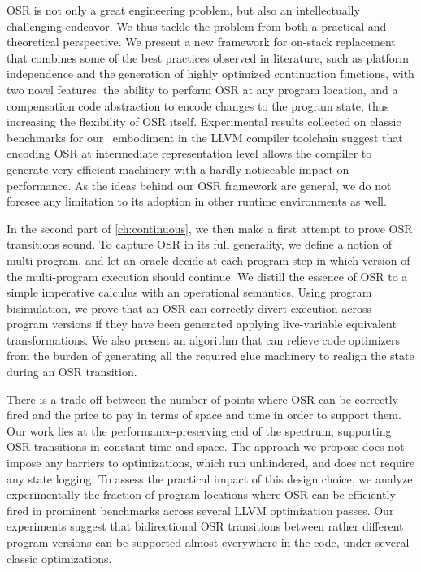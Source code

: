 OSR is not only a great engineering problem, but also an intellectually challenging endeavor. We thus tackle the problem from both a practical and theoretical perspective. We present a new framework for on-stack replacement that combines some of the best practices observed in literature, such as platform independence and the generation of highly optimized continuation functions, with two novel features: the ability to perform OSR at any program location, and a compensation code abstraction to encode changes to the program state, thus increasing the flexibility of OSR itself. Experimental results collected on classic benchmarks for our \osrkit\ embodiment in the LLVM compiler toolchain suggest that encoding OSR at intermediate representation level allows the compiler to generate very efficient machinery with a hardly noticeable impact on performance. As the ideas behind our OSR framework are general, we do not foresee any limitation to its adoption in other runtime environments as well.

In the second part of \mychapter\ref{ch:continuous}, we then make a first attempt to prove OSR transitions sound. To capture OSR in its full generality, we define a notion of multi-program, and let an oracle decide at each program step in which version of the multi-program execution should continue. We distill the essence of OSR to a simple imperative calculus with an operational semantics. Using program bisimulation, we prove that an OSR can correctly divert execution across program versions if they have been generated applying live-variable equivalent transformations. We also present an algorithm that can relieve code optimizers from the burden of generating all the required glue machinery to realign the state during an OSR transition.

There is a trade-off between the number of points where OSR can be correctly fired and the price to pay in terms of space and time in order to support them. Our work lies at the performance-preserving end of the spectrum, supporting OSR transitions in constant time and space. The approach we propose does not impose any barriers to optimizations, which run unhindered, and does not require any state logging. To assess the practical impact of this design choice, we analyze experimentally the fraction of program locations where OSR can be efficiently fired in prominent benchmarks across several LLVM optimization passes. Our experiments suggest that bidirectional OSR transitions between rather different program versions can be supported almost everywhere in the code, under several classic optimizations.


